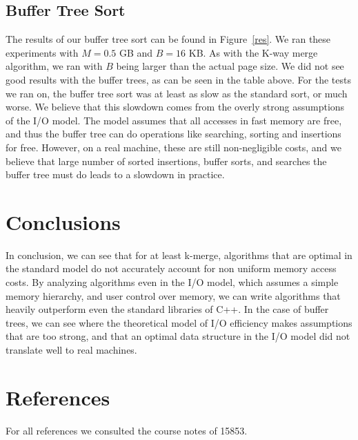 \documentclass{article}
\begin{document}
\subsection{Buffer Tree Sort}

The results of our buffer tree sort can be found in Figure~\ref{res}.
%
We ran these experiments with $M = 0.5$ GB and $B = 16$ KB.
%
As with the K-way merge algorithm, we ran with $B$ being larger than the actual page size.
%
We did not see good results with the buffer trees, as can be seen in the table above.
%
For the tests we ran on, the buffer tree sort was at least as slow as the standard sort,
or much worse.
%
We believe that this slowdown comes from the overly strong assumptions of the I/O
model.
%
The model assumes that all accesses in fast memory are free, and thus the buffer tree
can do operations like searching, sorting and insertions for free.
%
However, on a real machine, these are still non-negligible costs, and we believe that
large number of sorted insertions, buffer sorts, and searches the buffer tree must do leads
to a slowdown in practice.

\section{Conclusions}

In conclusion, we can see that for at least k-merge,
algorithms that are optimal in the standard model do not accurately
account for non uniform memory access costs.
%
By analyzing algorithms even in the I/O model, which assumes
a simple memory hierarchy, and user control over memory,
we can write algorithms that heavily outperform
even the standard libraries of C++.
%
In the case of buffer trees, we can see where the theoretical model of
I/O efficiency makes assumptions that are too strong, and that an optimal
data structure in the I/O model did not translate well to real machines.

\section{References}

For all references we consulted the course notes of 15853.
\end{document}
